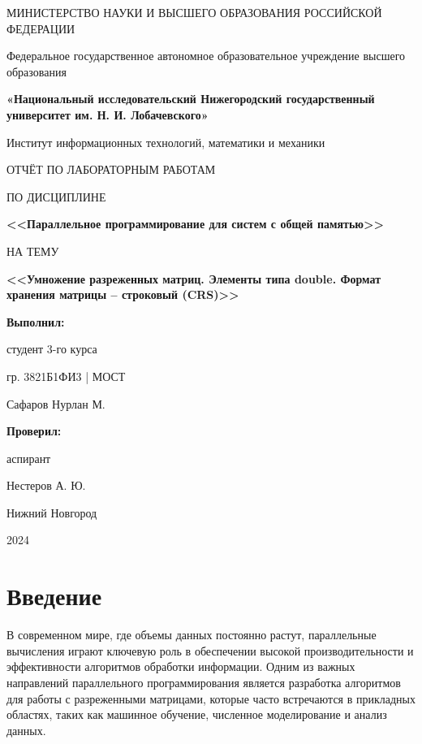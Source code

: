\documentclass[a4paper, 14pt]{article}
\newcommand{\n}{\par}
\begin{document}
	\thispagestyle{empty}
	\begin{center}
		
		МИНИСТЕРСТВО НАУКИ И ВЫСШЕГО ОБРАЗОВАНИЯ РОССИЙСКОЙ ФЕДЕРАЦИИ\n
		Федеральное государственное автономное образовательное учреждение высшего образования\n
		\textbf{«Национальный исследовательский Нижегородский государственный университет им. Н. И. Лобачевского»}\n
		Институт информационных технологий, математики и механики
		\vspace{1cm}
		
		ОТЧЁТ ПО ЛАБОРАТОРНЫМ РАБОТАМ
		
		ПО ДИСЦИПЛИНЕ
		
		\textbf{<<Параллельное программирование для систем с общей памятью>>}
		
		НА ТЕМУ
		
		\textbf{<<Умножение разреженных матриц. Элементы типа double. Формат хранения матрицы – строковый (CRS)>>}
	\end{center}
	\vspace{0.3cm}
	\begin{flushright}
		
		\textbf{Выполнил:}
		
		студент 3-го курса 
		
		гр. 3821Б1ФИ3 | МОСТ
		
		Сафаров Нурлан М.
	\end{flushright}
	
	\begin{flushright}
		\textbf{Проверил:}
		
		аспирант
		
		Нестеров А. Ю.
	\end{flushright}
	
	\begin{center}
		\vfill
		Нижний Новгород
		
		2024
	\end{center}
	\newpage
	\begin{center}\tableofcontents\end{center}
	\newpage
	\section*{\centering \textbf{Введение}}
	
	В современном мире, где объемы данных постоянно растут, параллельные вычисления играют ключевую роль в обеспечении высокой производительности и эффективности алгоритмов обработки информации. Одним из важных направлений параллельного программирования является разработка алгоритмов для работы с разреженными матрицами, которые часто встречаются в прикладных областях, таких как машинное обучение, численное моделирование и анализ данных.
	
\end{document}
